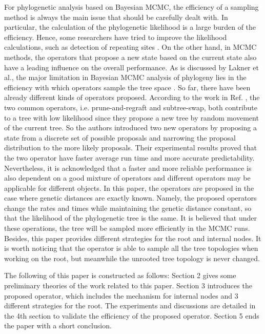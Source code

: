 \documentclass{bmcart}
\begin{document}
For phylogenetic analysis based on Bayesian MCMC, the efficiency of a sampling method is always the main issue that should be carefully dealt with. In particular, the calculation of the phylogenetic likelihood is a large burden of the efficiency. Hence, some researchers have tried to improve the likelihood calculations, such as detection of repeating sites \cite{kobert2017efficient}. On the other hand, in MCMC methods, the operators that propose a new state based on the current state also have a leading influence on the overall performance. As is discussed by Lakner et al., the major limitation in Bayesian MCMC analysis of phylogeny lies in the efficiency with which operators sample the tree space \cite{lakner2008efficiency}. So far, there have been already different kinds of operators proposed. According to the work in Ref. \cite{hohna2011guided}, the two common operators, i.e. prune-and-regraft and subtree-swap, both contribute to a tree with low likelihood since they propose a new tree by random movement of the current tree. So the authors introduced two new operators by proposing a state from a discrete set of possible proposals and narrowing the proposal distribution to the more likely proposals. Their experimental results proved that the two operator have faster average run time and more accurate predictability. Nevertheless, it is acknowledged that a faster and more reliable performance is also dependent on a good mixture of operators and different operators may be applicable for different objects. In this paper, the operators are proposed in the case where genetic distances are exactly known. Namely, the proposed operators change the rates and times while maintaining the genetic distance constant, so that the likelihood of the phylogenetic tree is the same. It is believed that under these operations, the tree will be sampled more efficiently in the MCMC runs. Besides, this paper provides different strategies for the root and internal nodes. It is worth noticing that the operator is able to sample all the tree topologies when working on the root, but meanwhile the unrooted tree topology is never changed. 

The following of this paper is constructed as follows: Section 2 gives some preliminary theories of the work related to this paper. Section 3 introduces the proposed operator, which includes the mechanism for internal nodes and 3 different strategies for the root. The experiments and discussions are detailed in the 4th section to validate the efficiency of the proposed operator. Section 5 ends the paper with a short conclusion.
\end{document}
